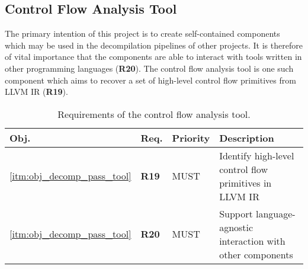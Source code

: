 
\subsection{Control Flow Analysis Tool}

The primary intention of this project is to create self-contained components which may be used in the decompilation pipelines of other projects. It is therefore of vital importance that the components are able to interact with tools written in other programming languages (\textbf{R20}). The control flow analysis tool is one such component which aims to recover a set of high-level control flow primitives from LLVM IR (\textbf{R19}).

\begin{table}[htbp]
	\begin{center}
		\begin{tabular}{|l|l|l|l|}
			\hline
			Obj. & Req. & Priority & Description \\
			\hline
			\ref{itm:obj_decomp_pass_tool} & \textbf{R19} & MUST & Identify high-level control flow primitives in LLVM IR \\
			\ref{itm:obj_decomp_pass_tool} & \textbf{R20} & MUST & Support language-agnostic interaction with other components \\
			\hline
		\end{tabular}
	\end{center}
	\caption{Requirements of the control flow analysis tool.}
\end{table}
